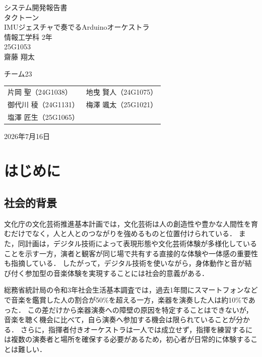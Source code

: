 \documentclass[uplatex,dvipdfmx]{jlreq}
\begin{document}
\hypersetup{pageanchor=false}

\begin{titlepage}
\centering
\vspace*{8mm}
\Huge\textsf{システム開発報告書}\\[12mm]
\LARGE\textsf{タクトーン}\\[3mm]
\Large\textsf{IMUジェスチャで奏でるArduinoオーケストラ}\\[14mm]
\Large\textsf{情報工学科 2年}\\
\Large\textsf{25G1053}\\[5pt]
\huge\textsf{齋藤 翔太}\par

\vspace{10mm}
\large\sffamily
\begin{itembox}[c]{チーム23}
\centering
\begin{tabular}{ll}
片岡 聖（24G1038）&
地曳 賢人（24G1075）\\
御代川 稜（24G1131）&
梅澤 颯太（25G1021）\\
塩澤 匠生（25G1065）&\\
\end{tabular}
\end{itembox}

\vfill
\Large\textsf{2026年7月16日}
\end{titlepage}
\clearpage
\hypersetup{pageanchor=true}

\section{はじめに}
\subsection{社会的背景}
文化庁の文化芸術推進基本計画では，文化芸術は人の創造性や豊かな人間性を育むだけでなく，人と人とのつながりを強めるものと位置付けられている\cite{bunka-plan}．
また，同計画は，デジタル技術によって表現形態や文化芸術体験が多様化していることを示す一方，演者と観客が同じ場で共有する直接的な体験や一体感の重要性も指摘している．
したがって，デジタル技術を使いながら，身体動作と音が結び付く参加型の音楽体験を実現することには社会的意義がある．

総務省統計局の令和3年社会生活基本調査では，過去1年間にスマートフォンなどで音楽を鑑賞した人の割合が50\%を超える一方，楽器を演奏した人は約10\%であった\cite{shakai2021}．
この差だけから楽器演奏への障壁の原因を特定することはできないが，音楽を聴く機会に比べて，自ら演奏へ参加する機会は限られていることが分かる．
さらに，指揮者付きオーケストラは一人では成立せず，指揮を練習するには複数の演奏者と場所を確保する必要があるため，初心者が日常的に体験することは難しい．
\end{document}
